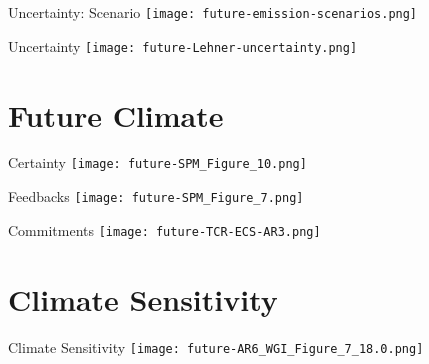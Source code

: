 \documentclass[aspectratio=169]{beamer}
\begin{document}
\begin{frame}{Uncertainty: Scenario}
    \centering
    \texttt{[image: future-emission-scenarios.png]}
\end{frame}

\begin{frame}{Uncertainty}
    \centering
    \texttt{[image: future-Lehner-uncertainty.png]}


\end{frame}

\section{Future Climate}

\begin{frame}{Certainty}
    \centering
    \texttt{[image: future-SPM\_Figure\_10.png]}
\end{frame}

\begin{frame}{Feedbacks}
    \centering
    \texttt{[image: future-SPM\_Figure\_7.png]}
\end{frame}

\begin{frame}{Commitments}
    \centering
    \texttt{[image: future-TCR-ECS-AR3.png]}
\end{frame}

\section{Climate Sensitivity}

\begin{frame}{Climate Sensitivity}
    \centering
    \texttt{[image: future-AR6\_WGI\_Figure\_7\_18.0.png]}
\end{frame}
\end{document}
